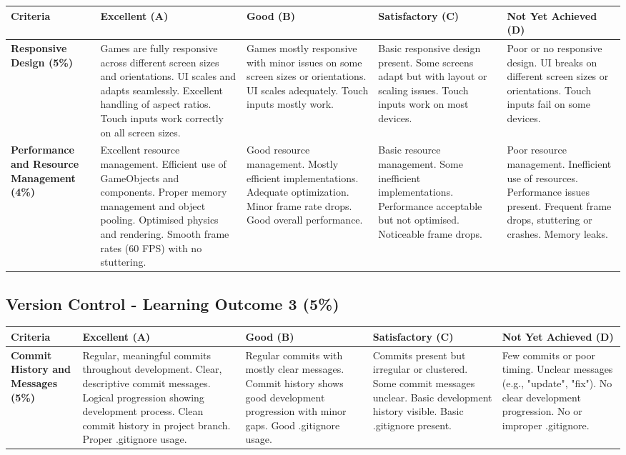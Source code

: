 \documentclass{article}
\begin{document}
\begin{landscape}
\begin{tabular}{|p{5cm}|p{4cm}|p{4cm}|p{4cm}|p{4cm}|}
\end{tabular}

\begin{tabular}{|p{5cm}|p{4cm}|p{4cm}|p{4cm}|p{4cm}|}
\hline
\textbf{Criteria} & \textbf{Excellent (A)} & \textbf{Good (B)} & \textbf{Satisfactory (C)} & \textbf{Not Yet Achieved (D)} \\ \hline

\textbf{Responsive Design (5\%)} & 
Games are fully responsive across different screen sizes and orientations. UI scales and adapts seamlessly. Excellent handling of aspect ratios. Touch inputs work correctly on all screen sizes. & 
Games mostly responsive with minor issues on some screen sizes or orientations. UI scales adequately. Touch inputs mostly work. & 
Basic responsive design present. Some screens adapt but with layout or scaling issues. Touch inputs work on most devices. & 
Poor or no responsive design. UI breaks on different screen sizes or orientations. Touch inputs fail on some devices. \\ \hline

\textbf{Performance and Resource Management (4\%)} & 
Excellent resource management. Efficient use of GameObjects and components. Proper memory management and object pooling. Optimised physics and rendering. Smooth frame rates (60 FPS) with no stuttering. & 
Good resource management. Mostly efficient implementations. Adequate optimization. Minor frame rate drops. Good overall performance. & 
Basic resource management. Some inefficient implementations. Performance acceptable but not optimised. Noticeable frame drops. & 
Poor resource management. Inefficient use of resources. Performance issues present. Frequent frame drops, stuttering or crashes. Memory leaks. \\ \hline

\end{tabular}

\subsection*{Version Control - Learning Outcome 3 (5\%)}

\begin{tabular}{|p{5cm}|p{4cm}|p{4cm}|p{4cm}|p{4cm}|}
\hline
\textbf{Criteria} & \textbf{Excellent (A)} & \textbf{Good (B)} & \textbf{Satisfactory (C)} & \textbf{Not Yet Achieved (D)} \\ \hline

\textbf{Commit History and Messages (5\%)} & 
Regular, meaningful commits throughout development. Clear, descriptive commit messages. Logical progression showing development process. Clean commit history in project branch. Proper .gitignore usage. & 
Regular commits with mostly clear messages. Commit history shows good development progression with minor gaps. Good .gitignore usage. & 
Commits present but irregular or clustered. Some commit messages unclear. Basic development history visible. Basic .gitignore present. & 
Few commits or poor timing. Unclear messages (e.g., "update", "fix"). No clear development progression. No or improper .gitignore. \\ \hline


\end{tabular}
\end{landscape}
\end{document}
